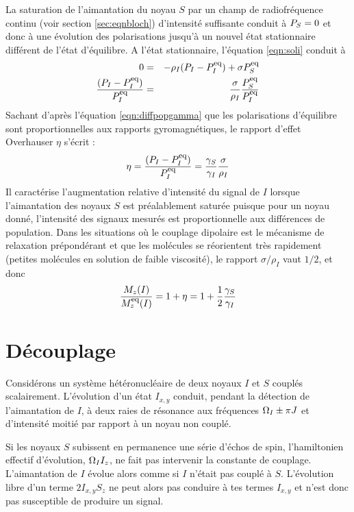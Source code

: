 La saturation de l'aimantation du noyau $S$ par un champ de radiofréquence continu
(voir section \ref{sec:eqnbloch}) d'intensité suffisante conduit à $P_{S} = 0$
et donc à une évolution des polarisations jusqu'à un nouvel état stationnaire
différent de l'état d'équilibre.
A l'état stationnaire, l'équation \ref{eqn:soli} conduit à
\begin{eqnarray}
0 & = & -\rho_I (P_{I}-P_{I}^{\mbox{\footnotesize{eq}}}) + \sigma P_{S}^{\mbox{\footnotesize{eq}}} \\
\frac{(P_{I}-P_{I}^{\mbox{\footnotesize{eq}}})}{P_{I}^{\mbox{\footnotesize{eq}}}} & = & \frac{\sigma}{\rho_I} \frac{P_{S}^{\mbox{\footnotesize{eq}}}}{P_{I}^{\mbox{\footnotesize{eq}}}}
\end{eqnarray}
Sachant d'après l'équation \ref{eqn:diffpopgamma} que les polarisations 
d'équilibre sont proportionnelles
aux rapports gyromagnétiques, le rapport d'effet Overhauser $\eta$ s'écrit :
\begin{equation}
\eta = \frac{(P_{I}-P_{I}^{\mbox{\footnotesize{eq}}})}{P_{I}^{\mbox{\footnotesize{eq}}}} = \frac{\gamma_S}{\gamma_I} \frac{\sigma}{\rho_I}
\end{equation}
Il caractérise l'augmentation relative d'intensité du signal de $I$ lorsque l'aimantation
des noyaux $S$ est préalablement saturée puisque pour un noyau donné,
l'intensité des signaux mesurés est proportionnelle aux différences de population.
Dans les situations où le couplage dipolaire est le mécanisme de relaxation prépondérant
et que les molécules se réorientent très rapidement (petites molécules en solution
de faible viscosité), le rapport $\sigma/\rho_I$ vaut $1/2$, et donc
\begin{equation}
\label{eqn:noe}
\frac{M_z(I)}{M^{\mbox{\footnotesize{eq}}}_z(I)} = 1+\eta = 1+\frac{1}{2}\frac{\gamma_S}{\gamma_I}
\end{equation}

\section{Découplage}
Considérons un système hétéronucléaire de deux noyaux $I$ et $S$ couplés scalairement.
L'évolution d'un état $I_{x,y}$ conduit, pendant la détection de l'aimantation de $I$, à
deux raies de résonance aux fréquences $\Omega_I \pm \pi J$ et d'intensité moitié par
rapport à un noyau non couplé.

Si les noyaux $S$ subissent en permanence une série d'échos de spin, 
l'hamiltonien effectif d'évolution, $\Omega_I I_z$, ne fait pas intervenir la constante
de couplage. 
L'aimantation de $I$ évolue alors comme si $I$ n'était pas couplé à $S$.
L'évolution libre d'un terme $2I_{x,y}S_z$ ne peut alors pas conduire
à tes termes $I_{x,y}$ et n'est donc pas susceptible de produire un signal.


